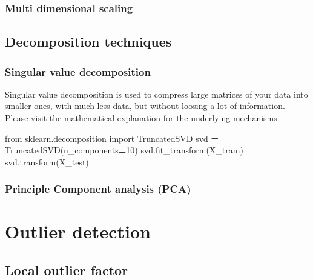 \documentclass[
]{book}
\newenvironment{Shaded}{\begin{snugshade}}{\end{snugshade}}
\newcommand{\DecValTok}[1]{\textcolor[rgb]{0.00,0.00,0.81}{#1}}
\newcommand{\ImportTok}[1]{#1}
\newcommand{\NormalTok}[1]{#1}
\newcommand{\OperatorTok}[1]{\textcolor[rgb]{0.81,0.36,0.00}{\textbf{#1}}}
\begin{document}
\hypertarget{multi-dimensional-scaling}{%
\subsubsection{Multi dimensional scaling}\label{multi-dimensional-scaling}}

\hypertarget{decomposition-techniques}{%
\subsection{Decomposition techniques}\label{decomposition-techniques}}

\hypertarget{SVD2}{%
\subsubsection{Singular value decomposition}\label{SVD2}}

Singular value decomposition is used to compress large matrices of your
data into smaller ones, with much less data, but without loosing a lot
of information. Please visit the \protect\hyperlink{SVD1}{mathematical explanation} for
the underlying mechanisms.\\

\begin{Shaded}
\begin{Highlighting}[]
\ImportTok{from}\NormalTok{ sklearn.decomposition }\ImportTok{import}\NormalTok{ TruncatedSVD}
\NormalTok{svd }\OperatorTok{=}\NormalTok{ TruncatedSVD(n\_components}\OperatorTok{=}\DecValTok{10}\NormalTok{)}
\NormalTok{svd.fit\_transform(X\_train)}
\NormalTok{svd.transform(X\_test)}
\end{Highlighting}
\end{Shaded}

\hypertarget{principle-component-analysis-pca}{%
\subsubsection{Principle Component analysis (PCA)}\label{principle-component-analysis-pca}}

\hypertarget{outlier-detection}{%
\section{Outlier detection}\label{outlier-detection}}

\hypertarget{local-outlier-factor}{%
\subsection{Local outlier factor}\label{local-outlier-factor}}
\end{document}
